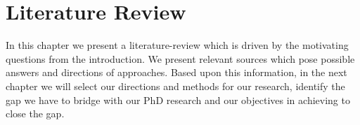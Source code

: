 \chapter{Literature Review}
\label{chap:literature}

In this chapter we present a literature-review which is driven by the motivating questions from the introduction. We present relevant sources which pose possible answers and directions of approaches. Based upon this information, in the next chapter we will select our directions and methods for our research, identify the gap we have to bridge with our PhD research and our objectives in achieving to close the gap.


















